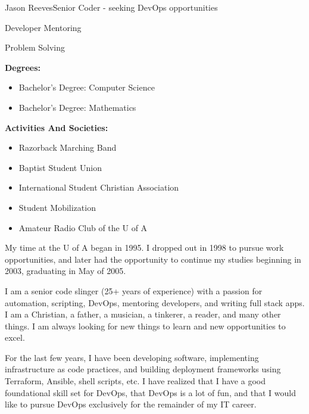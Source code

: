 \documentclass{article}
\begin{document}
\begin{cv}[avatar]{Jason Reeves}{Senior Coder - seeking DevOps opportunities}
\cvseparator
\begin{cvitem}
    Developer Mentoring
\end{cvitem}

\cvseparator
\begin{cvitem}
    Problem Solving
\end{cvitem}

\textbf{Degrees:}
\begin{itemize}
  \item Bachelor's Degree: Computer Science
  \item Bachelor's Degree: Mathematics
\end{itemize}
\vspace*{3mm}
\textbf{Activities And Societies:}
\begin{itemize}
  \item Razorback Marching Band
  \item Baptist Student Union
  \item International Student Christian Association
  \item Student Mobilization
  \item Amateur Radio Club of the U of A
\end{itemize}
\vspace*{3mm}
My time at the U of A began in 1995. I dropped out in 1998 to pursue work opportunities, and later had the opportunity to continue my studies beginning in 2003, graduating in May of 2005.


\switchcolumn
\renewcommand{\iscvsidebar}{0}

I am a senior code slinger (25+ years of experience) with a passion for automation, scripting, DevOps, mentoring developers, and writing full stack apps. I am a Christian, a father, a musician, a tinkerer, a reader, and many other things. I am always looking for new things to learn and new opportunities to excel.
\vspace*{3mm}

For the last few years, I have been developing software, implementing infrastructure as code practices, and building deployment frameworks using Terraform, Ansible, shell scripts, etc.  I have realized that I have a good foundational skill set for DevOps, that DevOps is a lot of fun, and that I would like to pursue DevOps exclusively for the remainder of my IT career.


\end{cv}
\end{document}
